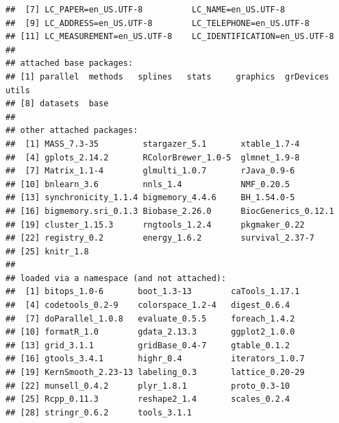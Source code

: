 \documentclass{article}\usepackage[]{graphicx}\usepackage[]{color}
\makeatletter
\newenvironment{kframe}{%
 \def\at@end@of@kframe{}%
 \ifinner\ifhmode%
  \def\at@end@of@kframe{\end{minipage}}%
  \begin{minipage}{\columnwidth}%
 \fi\fi%
 \def\FrameCommand##1{\hskip\@totalleftmargin \hskip-\fboxsep
 \colorbox{shadecolor}{##1}\hskip-\fboxsep
     \hskip-\linewidth \hskip-\@totalleftmargin \hskip\columnwidth}%
 \MakeFramed {\advance\hsize-\width
   \@totalleftmargin\z@ \linewidth\hsize
   \@setminipage}}%
 {\par\unskip\endMakeFramed%
 \at@end@of@kframe}
\newenvironment{knitrout}{}{} %
\makeatother
\begin{document}
\begin{knitrout}
\begin{kframe}
\begin{verbatim}
##  [7] LC_PAPER=en_US.UTF-8          LC_NAME=en_US.UTF-8          
##  [9] LC_ADDRESS=en_US.UTF-8        LC_TELEPHONE=en_US.UTF-8     
## [11] LC_MEASUREMENT=en_US.UTF-8    LC_IDENTIFICATION=en_US.UTF-8
## 
## attached base packages:
## [1] parallel  methods   splines   stats     graphics  grDevices utils    
## [8] datasets  base     
## 
## other attached packages:
##  [1] MASS_7.3-35         stargazer_5.1       xtable_1.7-4       
##  [4] gplots_2.14.2       RColorBrewer_1.0-5  glmnet_1.9-8       
##  [7] Matrix_1.1-4        glmulti_1.0.7       rJava_0.9-6        
## [10] bnlearn_3.6         nnls_1.4            NMF_0.20.5         
## [13] synchronicity_1.1.4 bigmemory_4.4.6     BH_1.54.0-5        
## [16] bigmemory.sri_0.1.3 Biobase_2.26.0      BiocGenerics_0.12.1
## [19] cluster_1.15.3      rngtools_1.2.4      pkgmaker_0.22      
## [22] registry_0.2        energy_1.6.2        survival_2.37-7    
## [25] knitr_1.8          
## 
## loaded via a namespace (and not attached):
##  [1] bitops_1.0-6       boot_1.3-13        caTools_1.17.1    
##  [4] codetools_0.2-9    colorspace_1.2-4   digest_0.6.4      
##  [7] doParallel_1.0.8   evaluate_0.5.5     foreach_1.4.2     
## [10] formatR_1.0        gdata_2.13.3       ggplot2_1.0.0     
## [13] grid_3.1.1         gridBase_0.4-7     gtable_0.1.2      
## [16] gtools_3.4.1       highr_0.4          iterators_1.0.7   
## [19] KernSmooth_2.23-13 labeling_0.3       lattice_0.20-29   
## [22] munsell_0.4.2      plyr_1.8.1         proto_0.3-10      
## [25] Rcpp_0.11.3        reshape2_1.4       scales_0.2.4      
## [28] stringr_0.6.2      tools_3.1.1
\end{verbatim}
\end{kframe}
\end{knitrout}
\end{document}

